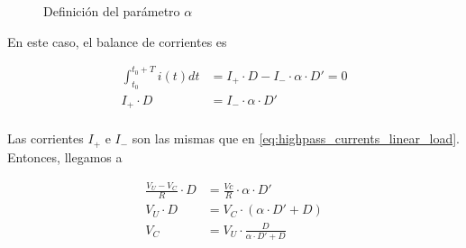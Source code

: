 \begin{figure}[h!]
    \begin{center}
    \end{center}
    \caption{Definición del parámetro $\alpha$}
    \label{fig:alpha_definition_plot}
\end{figure}
En este caso, el balance de corrientes es

\begin{equation}
    \label{eq:current_balance_capacitor_linear_load}
    \begin{aligned}
        \int_{t_0}^{t_0+T} i(t)dt &= I_+ \cdot D - I_- \cdot \alpha \cdot D' = 0 \\
        I_+ \cdot D &= I_- \cdot \alpha \cdot D' \\
    \end{aligned}
\end{equation}

Las corrientes $I_+$ e $I_-$ son las mismas que en
\ref{eq:highpass_currents_linear_load}. Entonces, llegamos a

\begin{equation}
    \label{eq:vc_non_linear_load_0}
    \begin{aligned}
        \frac{V_U-V_C}{R} \cdot D &= \frac{Vc}{R} \cdot \alpha \cdot D' \\
        V_U \cdot D &= V_C \cdot \left( \alpha \cdot D'+D \right) \\
        V_C &= V_U \cdot \frac{D}{\alpha \cdot D' + D}  \\
    \end{aligned}
\end{equation}

